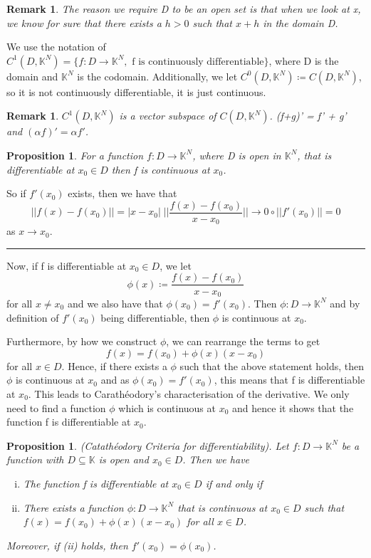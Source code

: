 \documentclass[twoside]{article}
\newtheorem{proposition}[theorem]{Proposition}
\newtheorem{remark}[theorem]{Remark}
\newenvironment{proof}{{\bf Proof:}}{\hfill\rule{2mm}{2mm}}
\begin{document}
\begin{remark} The reason we require D to be an open set is that when we look at x, we know for sure that there exists a $h > 0$ such that $x + h $ in the domain D.
\end{remark}

We use the notation of $C^1(D, \mathbb{K}^N) = \{f: D \rightarrow \mathbb{K}^N, \text{ f is continuously differentiable}\}$, where D is the domain and $\mathbb{K}^N$ is the codomain. Additionally, we let $C^0(D, \mathbb{K}^N) \coloneqq C(D,\mathbb{K}^N)$, so it is not continuously differentiable, it is just continuous.

\begin{remark} $C^1(D, \mathbb{K}^N)$ is a vector subspace of $C(D, \mathbb{K}^N)$. (f+g)' = f' + g' and $(\alpha f)' = \alpha f'$.
\end{remark}

\begin{proposition} For a function $f: D \rightarrow \mathbb{K}^N$, where D is open in $\mathbb{K}^N$, that is differentiable at $x_0 \in D$ then f is continuous at $x_0$. 
\end{proposition}

\begin{proof}
So if $f'(x_0)$ exists, then we have that
$$
||f(x) - f(x_0)|| = |x - x_0|\;\bigg|\bigg|\frac{f(x) - f(x_0)}{x - x_0}\bigg|\bigg| \rightarrow 0 \circ ||f'(x_0)|| = 0 
$$
as $x \rightarrow x_0$.
\end{proof}

\bigskip

Now, if f is differentiable at $x_0 \in D$, we let
$$
\phi(x) \coloneqq \frac{f(x) - f(x_0)}{x - x_0}
$$
for all $x \neq x_0$ and we also have that $\phi(x_0) = f'(x_0)$. Then $\phi: D \rightarrow \mathbb{K}^N$ and by definition of $f'(x_0)$ being differentiable, then $\phi$ is continuous at $x_0$. 

Furthermore, by how we construct $\phi$, we can rearrange the terms to get
$$
f(x) = f(x_0) + \phi(x)(x - x_0)
$$
for all $x \in D$. Hence, if there exists a $\phi$ such that the above statement holds, then $\phi$ is continuous at $x_0$ and as $\phi(x_0) = f'(x_0)$, this means that f is differentiable at $x_0$. This leads to Carathéodory's characterisation of the derivative. We only need to find a function $\phi$ which is continuous at $x_0$ and hence it shows that the function f is differentiable at $x_0$.

\begin{proposition}(Catathéodory Criteria for differentiability). Let $f: D \rightarrow \mathbb{K}^N$ be a function with $D \subseteq \mathbb{K}$ is open and $x_0 \in D$. Then we have
\begin{enumerate}[(i)]
  \item The function f is differentiable at $x_0 \in D$ if and only if 
  \item There exists a function $\phi:D \rightarrow \mathbb{K}^N$ that is continuous at $x_0 \in D$ such that $f(x) = f(x_0) + \phi(x)(x - x_0)$ for all $x \in D$.
\end{enumerate}

Moreover, if (ii) holds, then $f'(x_0) = \phi(x_0)$.
\end{proposition}
\end{document}
